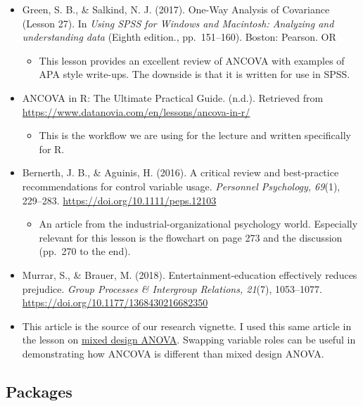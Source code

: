\documentclass[
  11pt,
]{book}
\providecommand{\tightlist}{%
  \setlength{\itemsep}{0pt}\setlength{\parskip}{0pt}}
\begin{document}
\begin{itemize}
\tightlist
\item
  Green, S. B., \& Salkind, N. J. (2017). One-Way Analysis of Covariance (Lesson 27). In \emph{Using SPSS for Windows and Macintosh: Analyzing and understanding data} (Eighth edition., pp.~151--160). Boston: Pearson. OR

  \begin{itemize}
  \tightlist
  \item
    This lesson provides an excellent review of ANCOVA with examples of APA style write-ups. The downside is that it is written for use in SPSS.
  \end{itemize}
\item
  ANCOVA in R: The Ultimate Practical Guide. (n.d.). Retrieved from \url{https://www.datanovia.com/en/lessons/ancova-in-r/}

  \begin{itemize}
  \tightlist
  \item
    This is the workflow we are using for the lecture and written specifically for R.
  \end{itemize}
\item
  Bernerth, J. B., \& Aguinis, H. (2016). A critical review and best‐practice recommendations for control variable usage. \emph{Personnel Psychology, 69}(1), 229--283. \url{https://doi.org/10.1111/peps.12103}

  \begin{itemize}
  \tightlist
  \item
    An article from the industrial-organizational psychology world. Especially relevant for this lesson is the flowchart on page 273 and the discussion (pp.~270 to the end).
  \end{itemize}
\item
  Murrar, S., \& Brauer, M. (2018). Entertainment-education effectively reduces prejudice. \emph{Group Processes \& Intergroup Relations, 21}(7), 1053--1077. \url{https://doi.org/10.1177/1368430216682350}
\item
  This article is the source of our research vignette. I used this same article in the lesson on \protect\hyperlink{Mixed}{mixed design ANOVA}. Swapping variable roles can be useful in demonstrating how ANCOVA is different than mixed design ANOVA.
\end{itemize}

\hypertarget{packages-7}{%
\subsection{Packages}\label{packages-7}}
\end{document}
